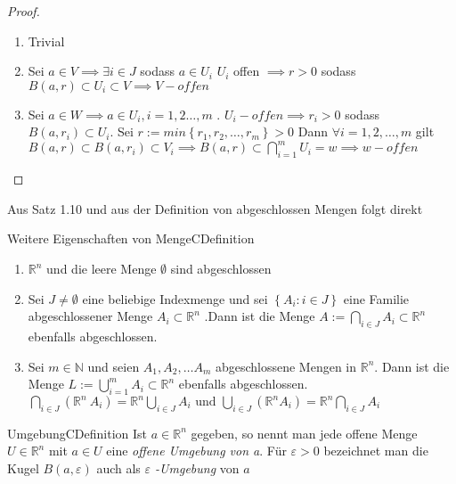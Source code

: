 \documentclass[11.5 pt, a4paper]{memoir}
\begin{document}
 \begin{proof}
     \begin{enumerate}[label=\alph*)]
         \item Trivial
         \item Sei $ a \in V \implies \exists i \in J$ sodass $ a \in U_i$
            $ U_{i} $ offen $ \implies r>0 $ sodass $ B(a,r) \subset U_{i}
            \subset V \implies V-offen$ 
         \item Sei $ a \in W \implies a \in U_{i}, i = 1,2 \dots , m $ . $ 
             U_{i}-offen \implies r_{i}>0  $ sodass $ B(a,r_i) \subset U_{i}
            $. Sei $ r:= min\left\{ r_1,r_2,\dots, r_{m} \right\} > 0 $  
            Dann $ \forall i = 1,2, \dots , m $ gilt $ B(a,r) \subset 
            B(a,r_i) \subset V_{i} \implies B(a,r) \subset 
            \bigcap\limits_{i=1}^{m} U_{i} = w \implies w-offen  $ 
     \end{enumerate}
 \end{proof}
 Aus Satz 1.10 und aus der Definition von abgeschlossen Mengen folgt direkt
 \begin{ibox}{Weitere Eigenschaften von Menge}{CDefinition}
     \begin{enumerate}[label=\alph*)]
         \item $ \mathbb{R}^n $ und die leere Menge $ \emptyset $ sind 
             abgeschlossen
         \item Sei $ J \neq \emptyset $ eine beliebige Indexmenge und sei 
             $ \left\{ A_{i} : i \in J \right\}  $ eine Familie
             abgeschlossener Menge $ A_{i} \subset \mathbb{R}^n $ .Dann ist
             die Menge $ A := \bigcap\limits_{i \in J}^{} A_{i} \subset 
             \mathbb{R}^n$ ebenfalls abgeschlossen.
         \item Sei $ m \in \mathbb{N}  $ und seien $ A_1, A_2, \dots A_{m}$
             abgeschlossene Mengen in $ \mathbb{R}^n $. Dann ist die Menge 
             $ L:= \bigcup\limits_{i=1}^{m} A_{i} \subset \mathbb{R}^n  $ 
             ebenfalls abgeschlossen. $ \bigcap\limits_{i \in J }^{}  \left( \mathbb{R}^n \ A_{i} \right) = \mathbb{R}^n
             \bigcup\limits_{i \in J}^{} A_{i} \text{ und } \bigcup\limits_{i \in J}^{} \left( \mathbb{R}^n A_{i} \right) = \mathbb{R}^n
             \bigcap\limits_{i \in J}^{} A_{i} $ 
     \end{enumerate}
 \end{ibox}
 
\begin{ibox}{Umgebung}{CDefinition}
    Ist $ a \in \mathbb{R}^n $ gegeben, so nennt man jede offene Menge $ U \in \mathbb{R}^n $ mit $ a \in U $ eine 
    \textit{offene Umgebung von a}. Für $ \varepsilon > 0 $ bezeichnet man die Kugel $ B(a,\varepsilon) $ 
    auch als \textit{ $\varepsilon$ -Umgebung }von $ a $ 
\end{ibox}
\end{document}
